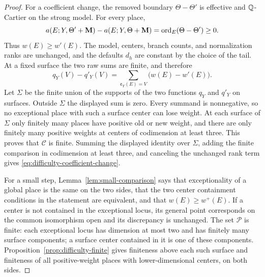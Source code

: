 \begin{proof}
For a coefficient change, the removed boundary \(\Theta-\Theta'\) is
effective and \(\mathbb{Q}\)-Cartier on the strong model.  For every place,
\[
 a(E;Y,\Theta'+\mathbf{M})-a(E;Y,\Theta+\mathbf{M})
 =\operatorname{ord}_E(\Theta-\Theta')\geq0.
\]
Thus \(w(E)\geq w'(E)\).  The model, centers, branch counts, and
normalization ranks are unchanged, and the defaults \(d_h\) are constant
by the choice of the tail.  At a fixed surface the two raw sums are finite,
and therefore
\[
 q_Y(V)-q'_Y(V)=\sum_{\cent_Y(E)=V}\bigl(w(E)-w'(E)\bigr).
\]
Let \(\Sigma\) be the finite union of the supports of the two functions
\(q_Y\) and \(q'_Y\) on surfaces.  Outside \(\Sigma\) the displayed
sum is zero.  Every summand is nonnegative, so no exceptional place with
such a surface center can lose weight.  At each surface of \(\Sigma\)
only finitely many places have positive old or new weight, and there are
only finitely many positive weights at centers of codimension at least
three.  This proves that \(\mathcal C\) is finite.  Summing the displayed
identity over \(\Sigma\), adding the finite comparison in codimension at
least three, and canceling the unchanged rank term gives
\eqref{eq:difficulty-coefficient-change}.

For a small step, Lemma~\ref{lem:small-comparison} says that exceptionality
of a global place is the same on the two sides, that the two center
containment conditions in the statement are equivalent, and that
\(w(E)\geq w^+(E)\).  If a center is not contained in the exceptional
locus, its general point corresponds on the common isomorphism open and its
discrepancy is unchanged.  The set \(\mathcal P\) is finite: each
exceptional locus has dimension at most two and has finitely many surface
components; a surface center contained in it is one of these components.
Proposition~\ref{prop:difficulty-finite} gives finiteness above each such
surface and finiteness of all positive-weight places with lower-dimensional
centers, on both sides.


\end{proof}

